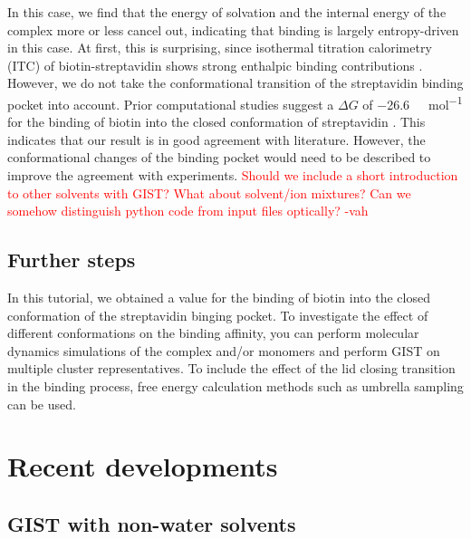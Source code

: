 \documentclass[9pt,tutorial]{livecoms}
\newcommand{\todo}{\textcolor{red}}
\begin{document}
In this case, we find that the energy of solvation and the internal energy of the complex more or less cancel out, indicating that binding is largely entropy-driven in this case.
At first, this is surprising, since isothermal titration calorimetry (ITC) of biotin-streptavidin shows strong enthalpic binding contributions \cite{mpye2020-biotin-itc,hyre2006-biotin-itc}.
However, we do not take the conformational transition of the streptavidin binding pocket into account.
Prior computational studies suggest a $\Delta G$ of \SI{-26.6}{\kilo\calorie\per\mole} for the binding of biotin into the closed conformation of streptavidin \cite{Bansal2018-biotin}.
This indicates that our result is in good agreement with literature.
However, the conformational changes of the binding pocket would need to be described to improve the agreement with experiments.
\todo{Should we include a short introduction to other solvents with GIST? What about solvent/ion mixtures? Can we somehow distinguish python code from input files optically? -vah}
\subsection{Further steps}
In this tutorial, we obtained a value for the binding of biotin into the closed conformation of the streptavidin binging pocket.
To investigate the effect of different conformations on the binding affinity, you can perform molecular dynamics simulations of the complex and/or monomers and perform GIST on multiple cluster representatives.
To include the effect of the lid closing transition in the binding process, free energy calculation methods such as umbrella sampling can be used.
%

\section{Recent developments}
\subsection{GIST with non-water solvents}
\end{document}
